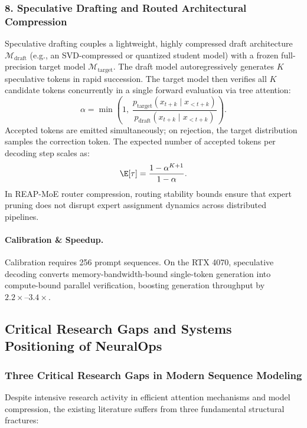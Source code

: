 \subsubsection{8. Speculative Drafting and Routed Architectural Compression}
\label{subsubsec:speculative_routing}
Speculative drafting couples a lightweight, highly compressed draft architecture $\mathcal{M}_{\text{draft}}$ (e.g., an SVD-compressed or quantized student model) with a frozen full-precision target model $\mathcal{M}_{\text{target}}$. The draft model autoregressively generates $K$ speculative tokens in rapid succession. The target model then verifies all $K$ candidate tokens concurrently in a single forward evaluation via tree attention:
\begin{equation}
\alpha = \min\left( 1, \; \frac{p_{\text{target}}(x_{t+k} \mid x_{<t+k})}{p_{\text{draft}}(x_{t+k} \mid x_{<t+k})} \right).
\end{equation}
Accepted tokens are emitted simultaneously; on rejection, the target distribution samples the correction token. The expected number of accepted tokens per decoding step scales as:
\begin{equation}
\E[\tau] = \frac{1 - \alpha^{K+1}}{1 - \alpha}.
\end{equation}
In REAP-MoE router compression, routing stability bounds ensure that expert pruning does not disrupt expert assignment dynamics across distributed pipelines.

\paragraph{Calibration \& Speedup.} Calibration requires 256 prompt sequences. On the RTX 4070, speculative decoding converts memory-bandwidth-bound single-token generation into compute-bound parallel verification, boosting generation throughput by $2.2\times\text{--}3.4\times$.

\subsection{Critical Research Gaps and Systems Positioning of NeuralOps}
\label{subsec:comparative_positioning}

\subsubsection{Three Critical Research Gaps in Modern Sequence Modeling}
Despite intensive research activity in efficient attention mechanisms and model compression, the existing literature suffers from three fundamental structural fractures:

